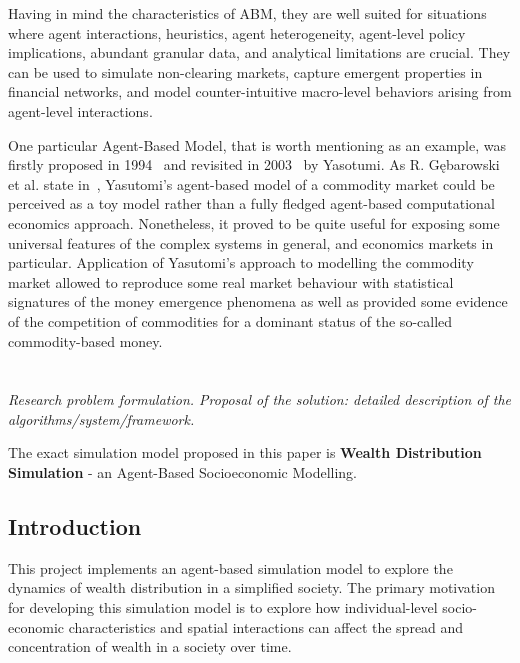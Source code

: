 \documentclass[english]{projectreport}
\begin{document}
Having in mind the characteristics of ABM, they are well suited for situations where agent interactions, heuristics, agent heterogeneity, agent-level policy implications, abundant granular data, and analytical limitations are crucial. They can be used to simulate non-clearing markets, capture emergent properties in financial networks, and model counter-intuitive macro-level behaviors arising from agent-level interactions.


One particular Agent-Based Model, that is worth mentioning as an example, was firstly proposed in 1994~\cite{yasutomiEmergenceCollapseMoney1995} and revisited in 2003~\cite{yasotumiItinerancyOfMoney2003} by Yasotumi. As R. Gębarowski et al. state in~\cite{gebarowskiAgentBasedModellingCommodity2016}, Yasutomi’s agent-based model of a commodity market could be perceived as a toy model rather than a fully fledged agent-based computational economics approach. Nonetheless, it proved to be quite useful for exposing some universal features of the complex systems in general, and economics markets in particular. Application of Yasutomi’s approach to modelling the commodity market allowed to reproduce some real market behaviour with statistical signatures of the money emergence phenomena as well as provided some evidence of the competition of commodities for a dominant status of the so-called commodity-based money.


\section{\SectionTitleProblemSolution}
\label{sec:solution}


\emph{Research problem formulation. Proposal of the solution: detailed description of the algorithms/system/framework.}

The exact simulation model proposed in this paper is \textbf{Wealth Distribution Simulation} - an Agent-Based Socioeconomic Modelling.

\subsection{Introduction}

This project implements an agent-based simulation model to explore the dynamics of wealth distribution in a simplified society. The primary motivation for developing this simulation model is to explore how individual-level socio-economic characteristics and spatial interactions can affect the spread and concentration of wealth in a society over time.
\end{document}
